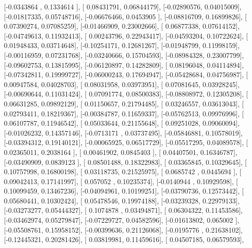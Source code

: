 \documentclass{article}
\begin{document}
       [-0.0343864 ,  0.1334614 ],
       [ 0.08431791,  0.06844179],
       [-0.02890576,  0.04015009],
       [-0.01817335,  0.05748716],
       [-0.06676466,  0.0453905 ],
       [-0.08816709,  0.16899826],
       [ 0.07390274,  0.07085259],
       [-0.01466909,  0.23002666],
       [ 0.06877338,  0.07614152],
       [-0.04749613,  0.11932413],
       [ 0.00243796,  0.22943417],
       [-0.04593204,  0.10722624],
       [ 0.01948433,  0.03714648],
       [-0.10254171,  0.12681267],
       [-0.01948799,  0.11998159],
       [-0.00116959,  0.07231768],
       [-0.03240666,  0.15704593],
       [-0.08984328,  0.23007799],
       [-0.09602753,  0.13815995],
       [-0.06120897,  0.14282809],
       [ 0.08196048,  0.04114894],
       [-0.07342811,  0.19999727],
       [-0.06000243,  0.17694947],
       [-0.05428684,  0.04756987],
       [ 0.00947584,  0.04028703],
       [ 0.08031958,  0.03973951],
       [ 0.07081645,  0.03928245],
       [-0.00690644,  0.11031424],
       [ 0.07091774,  0.08500383],
       [-0.08808972,  0.12305208],
       [ 0.06631285,  0.09892129],
       [ 0.01150657,  0.21794485],
       [ 0.03246557,  0.03613043],
       [ 0.02793411,  0.18219367],
       [-0.00384787,  0.11659337],
       [-0.05762513,  0.09976996],
       [ 0.06107787,  0.11946542],
       [ 0.05033644,  0.21155648],
       [ 0.09251028,  0.09060094],
       [-0.01026232,  0.14357146],
       [-0.0713171 ,  0.03737495],
       [-0.05846881,  0.10578019],
       [-0.03394312,  0.19140121],
       [-0.00065925,  0.06517729],
       [-0.05517295,  0.04089578],
       [ 0.02365011,  0.2038164 ],
       [ 0.00461902,  0.0845403 ],
       [ 0.04407501,  0.16346787],
       [-0.03490909,  0.0839123 ],
       [ 0.08501488,  0.18322983],
       [ 0.03365845,  0.10329645],
       [ 0.10757998,  0.16800198],
       [ 0.03118735,  0.21525975],
       [ 0.0685742 ,  0.0445694 ],
       [ 0.09042413,  0.17141997],
       [ 0.057052  ,  0.10235374],
       [-0.0140944 ,  0.10929598],
       [ 0.10099459,  0.13467236],
       [-0.04094961,  0.10199251],
       [-0.03790736,  0.12573442],
       [ 0.05680441,  0.10302424],
       [ 0.05478546,  0.19974188],
       [-0.03239328,  0.22979133],
       [-0.03273277,  0.05444327],
       [ 0.1074878 ,  0.03494871],
       [ 0.06304322,  0.11453586],
       [-0.03462974,  0.05279847],
       [-0.07229727,  0.04582596],
       [-0.01613802,  0.065002  ],
       [-0.05508761,  0.15958152],
       [-0.00399636,  0.21126068],
       [-0.0195776 ,  0.21638102],
       [-0.12445321,  0.20281426],
       [ 0.03819981,  0.11459616],
       [ 0.04507185,  0.06579593],
\end{document}
